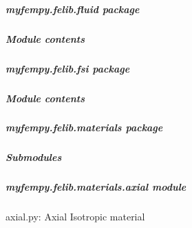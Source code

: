 \documentclass[letterpaper,10pt,english]{sphinxmanual}
\begin{document}
\subparagraph{myfempy.felib.fluid package}
\label{\detokenize{myfempy.felib.fluid:myfempy-felib-fluid-package}}\label{\detokenize{myfempy.felib.fluid::doc}}

\subparagraph{Module contents}
\label{\detokenize{myfempy.felib.fluid:module-myfempy.felib.fluid}}\label{\detokenize{myfempy.felib.fluid:module-contents}}
\sphinxstepscope


\subparagraph{myfempy.felib.fsi package}
\label{\detokenize{myfempy.felib.fsi:myfempy-felib-fsi-package}}\label{\detokenize{myfempy.felib.fsi::doc}}

\subparagraph{Module contents}
\label{\detokenize{myfempy.felib.fsi:module-myfempy.felib.fsi}}\label{\detokenize{myfempy.felib.fsi:module-contents}}
\sphinxstepscope


\subparagraph{myfempy.felib.materials package}
\label{\detokenize{myfempy.felib.materials:myfempy-felib-materials-package}}\label{\detokenize{myfempy.felib.materials::doc}}

\subparagraph{Submodules}
\label{\detokenize{myfempy.felib.materials:submodules}}

\subparagraph{myfempy.felib.materials.axial module}
\label{\detokenize{myfempy.felib.materials:module-myfempy.felib.materials.axial}}\label{\detokenize{myfempy.felib.materials:myfempy-felib-materials-axial-module}}
\sphinxAtStartPar
axial.py: Axial Isotropic material
\end{document}
